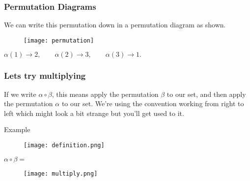 \documentclass{beamer}
\begin{document}
\begin{frame}
  \frametitle{Permutation Diagrams}
  We can write this permutation down in a permutation diagram as shown. 

\begin{figure}[h]
  \centering
  \texttt{[image: permutation]}
\end{figure}

$\alpha(1) \rightarrow 2,\qquad \alpha(2) \rightarrow 3,\qquad \alpha(3) \rightarrow 1.$ 

\end{frame}

\begin{frame}
  \frametitle{Lets try multiplying}
  
If we write $\alpha \circ \beta$, this means apply the permutation $\beta$ to our set, and then apply the permutation $\alpha$ to our set. 
We're using the convention working from right to left which might look a bit strange but you'll get used to it.%

Example

\begin{figure}[h]
  \centering
  
  \texttt{[image: definition.png]}
\end{figure}

$\alpha \circ \beta = $

\begin{figure}[h]
  \centering
  
\texttt{[image: multiply.png]}
\end{figure}
\end{frame}





%
%
%
\end{document}
